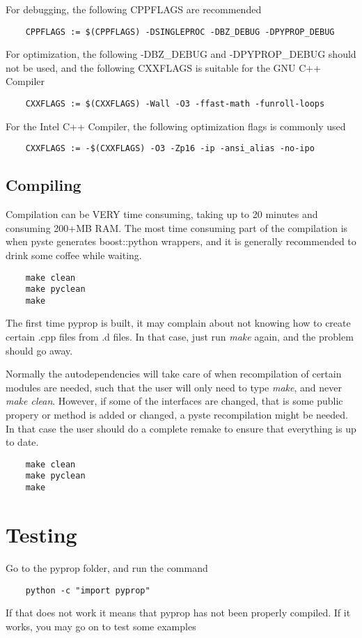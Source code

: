 For debugging, the following CPPFLAGS are recommended
\begin{verbatim}
	CPPFLAGS := $(CPPFLAGS) -DSINGLEPROC -DBZ_DEBUG -DPYPROP_DEBUG
\end{verbatim}
For optimization, the following -DBZ\_DEBUG and -DPYPROP\_DEBUG should not be used, and the following
CXXFLAGS is suitable for the GNU C++ Compiler
\begin{verbatim}
	CXXFLAGS := $(CXXFLAGS) -Wall -O3 -ffast-math -funroll-loops
\end{verbatim}
For the Intel C++ Compiler, the following optimization flags is commonly used
\begin{verbatim}
	CXXFLAGS := -$(CXXFLAGS) -O3 -Zp16 -ip -ansi_alias -no-ipo
\end{verbatim}

\subsection*{Compiling}
Compilation can be VERY time consuming, taking up to 20 minutes and consuming 200+MB RAM. 
The most time consuming part of the compilation is when pyste generates boost::python wrappers, and
it is generally recommended to drink some coffee while waiting.
\begin{verbatim}
	make clean
	make pyclean
	make
\end{verbatim}
The first time pyprop is built, it may complain about not knowing how to create certain .cpp files from
.d files. In that case, just run \textit{make} again, and the problem should go away.


Normally the autodependencies will take care of when recompilation of certain modules are needed, 
such that the user will only need to type \textit{make}, and never \textit{make clean}. However, if
some of the interfaces are changed, that is some public propery or method is added or changed, a pyste
recompilation might be needed. In that case the user should do a complete remake to ensure that everything
is up to date.
\begin{verbatim}
	make clean
	make pyclean
	make
\end{verbatim}

\section{Testing}
Go to the pyprop folder, and run the command
\begin{verbatim}
	python -c "import pyprop"
\end{verbatim}
If that does not work it means that pyprop has not been properly compiled. If it works, you may go 
on to test some examples

